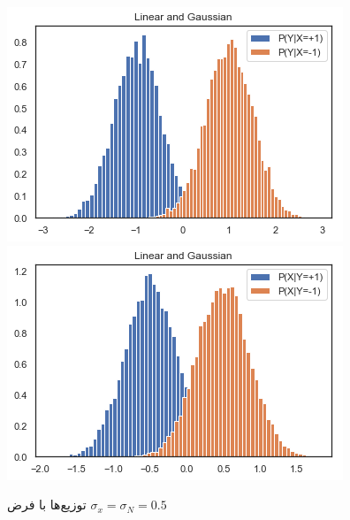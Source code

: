 \documentclass[papersize=a4]{report}
\begin{document}
\begin{enumerate}
\begin{figure}
\begin{floatrow}
			\includegraphics[scale=0.35]{lin_cond2.png}
			\includegraphics[scale=0.35]{lin_cond3.png}
		\end{floatrow}
		\caption{توزیع‌ها با فرض 	$\sigma_x = \sigma_N = 0.5$	}
		\label{1}
	\end{figure}


\end{enumerate}
\end{document}
